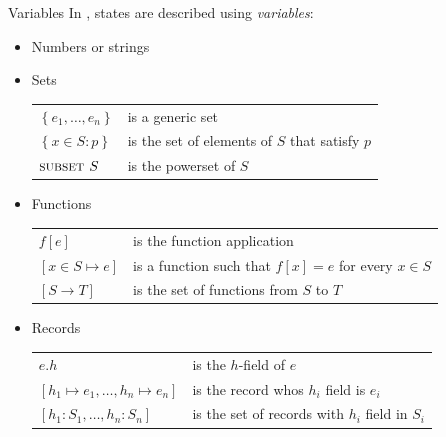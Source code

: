 \begin{frame}{Variables}
    In \tlap, states are described using \emph{variables}:
    \begin{itemize}
        \item<1-> Numbers or strings
        \item<2-> Sets\\
         {
            \begin{center}
                \begin{tabular}{ll}
                    $\left\{ e_1, \dots, e_n \right\}$ & is a generic set\\
                    $\left\{ x \in S : p \right\}$ & is the set of elements of $S$ that satisfy $p$\\
                    $\textsc{subset } S$ & is the powerset of $S$\\
                \end{tabular}
            \end{center}
        }
        \item<3-> Functions\\
         {
            \begin{center}
                \begin{tabularx}{0.9\textwidth}{lX}
                    $f \left[ e \right]$ & is the function application\\
                    $\left[ x \in S \mapsto e \right]$ & is a function such that $f \left[ x \right] = e$ for every $x \in S$\\
                    $\left[ S \rightarrow T \right]$ & is the set of functions from $S$ to $T$\\
                \end{tabularx}
            \end{center}
        }
        \item<4-> Records
         {
            \begin{center}
                \begin{tabularx}{0.92\textwidth}{lX}
                    $e.h$ & is the $h$-field of $e$\\
                    $\left[ h_1 \mapsto e_1, \dots, h_n \mapsto e_n \right]$ & is the record whos $h_i$ field is $e_i$\\
                    $\left[ h_1 : S_1, \dots, h_n : S_n \right]$ & is the set of records with $h_i$ field in $S_i$\\
                \end{tabularx}

\end{center}}
\end{itemize}
\end{frame}
